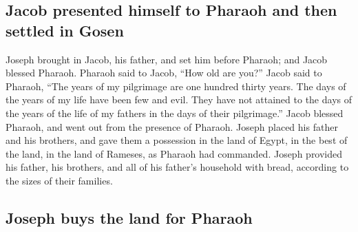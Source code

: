 \hypertarget{jacob-presented-himself-to-pharaoh-and-then-settled-in-gosen}{%
\subsection{Jacob presented himself to Pharaoh and then settled in
Gosen}\label{jacob-presented-himself-to-pharaoh-and-then-settled-in-gosen}}

 Joseph brought in Jacob, his father, and set him before
Pharaoh; and Jacob blessed Pharaoh.  Pharaoh said to
Jacob, ``How old are you?''  Jacob said to Pharaoh, ``The
years of my pilgrimage are one hundred thirty years. The days of the
years of my life have been few and evil. They have not attained to the
days of the years of the life of my fathers in the days of their
pilgrimage.''  Jacob blessed Pharaoh, and went out from
the presence of Pharaoh.  Joseph placed his father and
his brothers, and gave them a possession in the land of Egypt, in the
best of the land, in the land of Rameses, as Pharaoh had commanded.
 Joseph provided his father, his brothers, and all of his
father's household with bread, according to the sizes of their families.

\hypertarget{joseph-buys-the-land-for-pharaoh}{%
\subsection{Joseph buys the land for
Pharaoh}\label{joseph-buys-the-land-for-pharaoh}}


